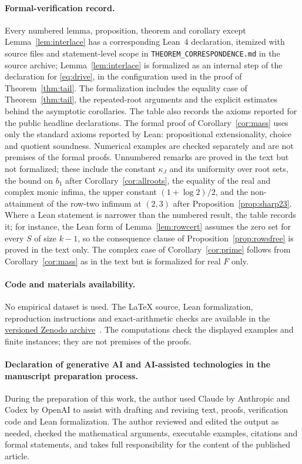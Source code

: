 \documentclass[11pt]{article}
\begin{document}
\paragraph{Formal-verification record.}
Every numbered lemma, proposition, theorem and corollary except
Lemma~\ref{lem:interlace} has a corresponding Lean~4 declaration, itemized
with source files and statement-level scope in
\texttt{THEOREM\_CORRESPONDENCE.md} in the source archive;
Lemma~\ref{lem:interlace} is formalized as an internal step of the
declaration for \eqref{eq:drive}, in the configuration used in the proof of
Theorem~\ref{thm:tail}.  The formalization includes the equality case of
Theorem~\ref{thm:tail}, the repeated-root arguments and the explicit
estimates behind the asymptotic corollaries.  The table also records the
axioms reported for the public headline declarations.  The formal proof of
Corollary~\ref{cor:mass} uses only the standard axioms reported by Lean:
propositional extensionality, choice and quotient soundness.  Numerical
examples are checked separately and are not premises of the formal proofs.
Unnumbered remarks are proved in the text but not formalized; these include
the constant $\kappa_J$ and its uniformity over root sets, the bound on $b_1$
after Corollary~\ref{cor:allroots}, the equality of the real and complex
monic infima, the upper constant $(1+\log2)/2$, and the non-attainment of the
row-two infimum at $(2,3)$ after Proposition~\ref{prop:sharp23}.  Where a Lean statement is narrower than the
numbered result, the table records it; for instance, the Lean form of
Lemma~\ref{lem:rowcert} assumes the zero set for every $S$ of size $k-1$,
so the consequence clause of Proposition~\ref{prop:rowsfree} is proved in
the text only.  The complex case of Corollary~\ref{cor:prime}
follows from Corollary~\ref{cor:mass} as in the text but is formalized for
real $F$ only.

\paragraph{Code and materials availability.}
No empirical dataset is used.  The LaTeX source, Lean formalization,
reproduction instructions and exact-arithmetic checks are available in the
\href{https://doi.org/10.5281/zenodo.22998724}{versioned Zenodo archive}~\cite{archive}.
The computations check the displayed examples and finite instances; they are
not premises of the proofs.

\paragraph{Declaration of generative AI and AI-assisted technologies in the manuscript preparation process.}
During the preparation of this work, the author used Claude by Anthropic and
Codex by OpenAI to assist with drafting and revising text, proofs,
verification code and Lean formalization.  The author reviewed and edited the
output as needed, checked the mathematical arguments, executable examples,
citations and formal statements, and takes full responsibility for the
content of the published article.
\end{document}
